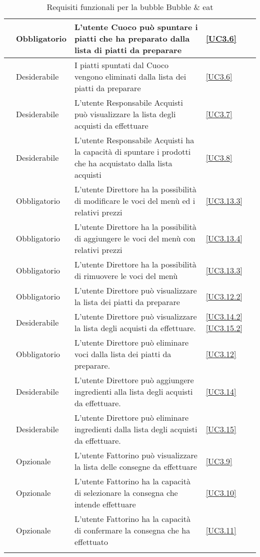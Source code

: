 \begin{longtable}{|P{1.5cm}|P{2.5cm}|P{6.5cm}|P{2.5cm}|}
	\hline \RequisitoObF\label{L26} & Obbligatorio & L'utente Cuoco può spuntare i piatti che ha preparato dalla lista di piatti da preparare  & \ref{UC3.6} \\
	\hline \RequisitoDF\label{L78} & Desiderabile & I piatti spuntati dal Cuoco vengono eliminati dalla lista dei piatti da preparare & \ref{UC3.6} \\
	\hline \RequisitoDF\label{L27} & Desiderabile & L'utente Responsabile Acquisti può visualizzare la lista degli acquisti da effettuare & \ref{UC3.7} \\
	\hline \RequisitoDF\label{L28} & Desiderabile & L'utente Responsabile Acquisti ha la capacità di spuntare i prodotti che ha acquistato dalla lista acquisti
	 & \ref{UC3.8} \\
	\hline \RequisitoObF\label{L29} & Obbligatorio & L'utente Direttore ha la possibilità di modificare le voci del menù ed i relativi prezzi & \ref{UC3.13.3} \\
	\hline \RequisitoObF\label{L79} & Obbligatorio & L'utente Direttore ha la possibilità di aggiungere le voci del menù con relativi prezzi & \ref{UC3.13.4} \\
	\hline \RequisitoObF\label{L80} & Obbligatorio & L'utente Direttore ha la possibilità di rimuovere le voci del menù & \ref{UC3.13.3} \\
	\hline \RequisitoObF\label{L30} & Obbligatorio & L'utente Direttore può visualizzare la lista dei piatti da preparare & \ref{UC3.12.2} \\
	\hline \RequisitoDF\label{L31} & Desiderabile & L'utente Direttore può visualizzare la lista degli acquisti da effettuare. & \ref{UC3.14.2} \ref{UC3.15.2} \\
	\hline \RequisitoObF\label{L32} & Obbligatorio & L'utente Direttore può eliminare voci dalla lista dei piatti da preparare. & \ref{UC3.12} \\
	\hline \RequisitoDF\label{L53} & Desiderabile & L'utente Direttore può aggiungere ingredienti alla lista degli acquisti da effettuare. & \ref{UC3.14}\\
	 \hline \RequisitoDF\label{L65} & Desiderabile & L'utente Direttore può eliminare ingredienti dalla lista degli acquisti da effettuare. & \ref{UC3.15} \\	 
	\hline \RequisitoOpF\label{L50} & Opzionale & L'utente Fattorino può visualizzare la lista delle consegne da effettuare & \ref{UC3.9} \\
	\hline \RequisitoOpF\label{L51} & Opzionale & L'utente Fattorino ha la capacità di selezionare la consegna che intende effettuare & \ref{UC3.10} \\
	\hline \RequisitoOpF\label{L52} & Opzionale & L'utente Fattorino ha la capacità di confermare la consegna che ha effettuato & \ref{UC3.11} \\
	\hline
	\caption{Requisiti funzionali per la bubble Bubble \& eat}
\end{longtable}

